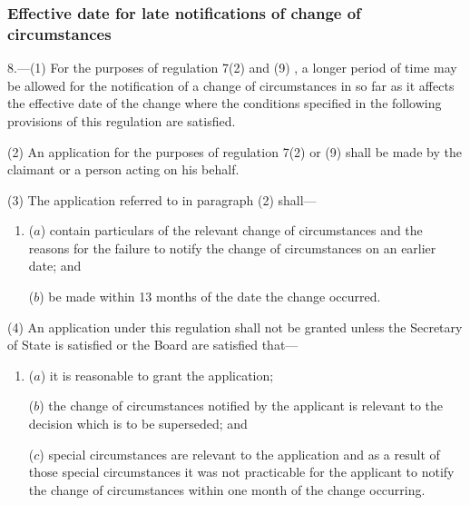 \documentclass[12pt,a4paper]{article}
\begin{document}

\subsubsection[8. Effective date for late notifications of change of circumstances]{Effective date for late notifications of change of circumstances}

8.—(1) For the purposes of regulation 7(2)
and (9)%
, a longer period of time may be allowed for the notification of a change of circumstances in so far as it affects the effective date of the change where the conditions specified in the following provisions of this regulation are satisfied.

(2) An application for the purposes of regulation 7(2) 
or (9)  %
shall be made by the claimant or a person acting on his behalf.

(3) The application referred to in paragraph (2) shall—
\begin{enumerate}\item[]
($a$) contain particulars of the relevant change of circumstances and the reasons for the failure to notify the change of circumstances on an earlier date; and

($b$) be made within 13 months of the date the change occurred.
\end{enumerate}

(4) An application under this regulation shall not be granted unless the Secretary of State is satisfied 
or the Board are satisfied  %
that—
\begin{enumerate}\item[]
($a$) it is reasonable to grant the application;

($b$) the change of circumstances notified by the applicant is relevant to the decision which is to be superseded; and

($c$) special circumstances are relevant to the application and as a result of those special circumstances it was not practicable for the applicant to notify the change of circumstances within one month of the change occurring.
\end{enumerate}
\end{document}
